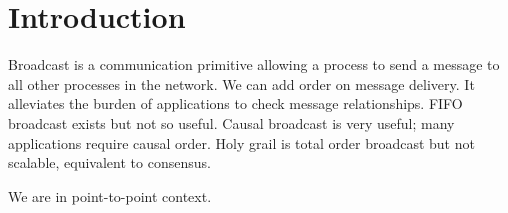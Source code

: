 
\section{Introduction}

Broadcast is a communication primitive allowing a process to send a message to
all other processes in the network. We can add order on message delivery. It
alleviates the burden of applications to check message relationships. FIFO
broadcast exists but not so useful. Causal broadcast is very useful; many
applications require causal order. Holy grail is total order broadcast but not
scalable, equivalent to consensus.

We are in point-to-point context.

